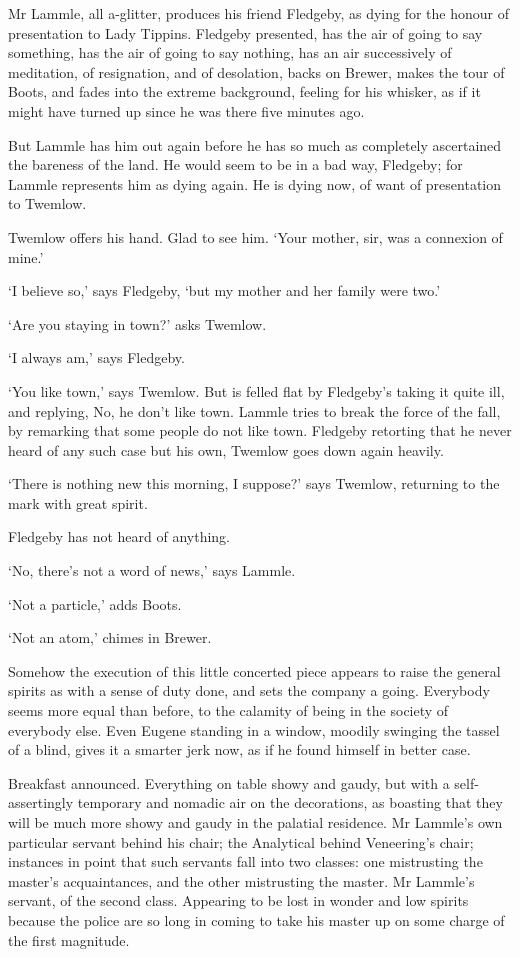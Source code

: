 Mr Lammle, all a-glitter, produces his friend Fledgeby, as dying for the
honour of presentation to Lady Tippins. Fledgeby presented, has the air
of going to say something, has the air of going to say nothing, has an
air successively of meditation, of resignation, and of desolation,
backs on Brewer, makes the tour of Boots, and fades into the extreme
background, feeling for his whisker, as if it might have turned up since
he was there five minutes ago.

But Lammle has him out again before he has so much as completely
ascertained the bareness of the land. He would seem to be in a bad way,
Fledgeby; for Lammle represents him as dying again. He is dying now, of
want of presentation to Twemlow.

Twemlow offers his hand. Glad to see him. ‘Your mother, sir, was a
connexion of mine.’

‘I believe so,’ says Fledgeby, ‘but my mother and her family were two.’

‘Are you staying in town?’ asks Twemlow.

‘I always am,’ says Fledgeby.

‘You like town,’ says Twemlow. But is felled flat by Fledgeby’s taking
it quite ill, and replying, No, he don’t like town. Lammle tries to
break the force of the fall, by remarking that some people do not like
town. Fledgeby retorting that he never heard of any such case but his
own, Twemlow goes down again heavily.

‘There is nothing new this morning, I suppose?’ says Twemlow, returning
to the mark with great spirit.

Fledgeby has not heard of anything.

‘No, there’s not a word of news,’ says Lammle.

‘Not a particle,’ adds Boots.

‘Not an atom,’ chimes in Brewer.

Somehow the execution of this little concerted piece appears to raise
the general spirits as with a sense of duty done, and sets the company a
going. Everybody seems more equal than before, to the calamity of being
in the society of everybody else. Even Eugene standing in a window,
moodily swinging the tassel of a blind, gives it a smarter jerk now, as
if he found himself in better case.

Breakfast announced. Everything on table showy and gaudy, but with
a self-assertingly temporary and nomadic air on the decorations, as
boasting that they will be much more showy and gaudy in the palatial
residence. Mr Lammle’s own particular servant behind his chair; the
Analytical behind Veneering’s chair; instances in point that
such servants fall into two classes: one mistrusting the master’s
acquaintances, and the other mistrusting the master. Mr Lammle’s
servant, of the second class. Appearing to be lost in wonder and low
spirits because the police are so long in coming to take his master up
on some charge of the first magnitude.

